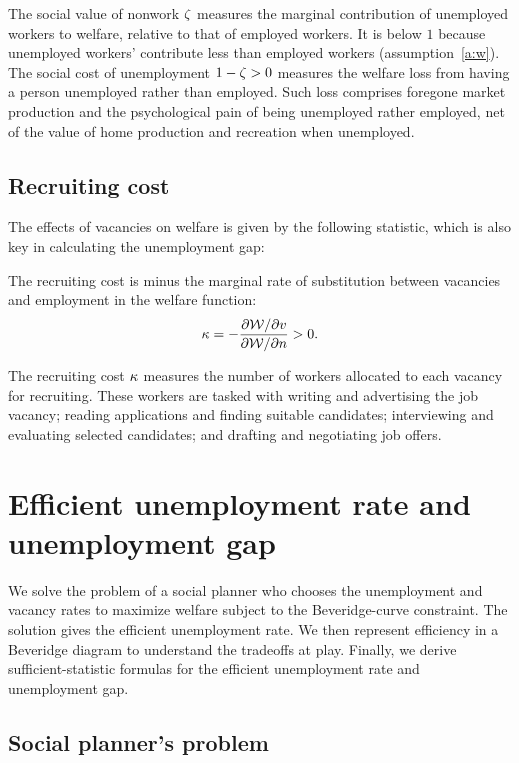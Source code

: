 \documentclass[letterpaper,12pt,leqno]{article}
\begin{document}
The social value of nonwork $\zeta$ measures the marginal contribution of unemployed workers to welfare, relative to that of employed workers. It is below $1$ because unemployed workers' contribute less than employed workers (assumption~\ref{a:w}). The social cost of unemployment $1-\zeta>0$ measures the welfare loss from having a person unemployed rather than employed. Such loss comprises foregone market production and the psychological pain of being unemployed rather employed, net of the value of home production and recreation when unemployed.

\subsection{Recruiting cost} 

The effects of vacancies on welfare is given by the following statistic, which is also key in calculating the unemployment gap:

\begin{definition} The recruiting cost is minus the marginal rate of substitution between vacancies and employment in the welfare function:
\begin{equation*}
\kappa = -\frac{\partial \mathcal{W}/\partial v}{\partial \mathcal{W}/\partial n} > 0.
\end{equation*}\end{definition}

The recruiting cost $\kappa$ measures the number of workers allocated to each vacancy for recruiting. These workers are tasked with writing and advertising the job vacancy; reading applications and finding suitable candidates; interviewing and evaluating selected candidates; and drafting and negotiating job offers.

\section{Efficient unemployment rate and unemployment gap}

We solve the problem of a social planner who chooses the unemployment and vacancy rates to maximize welfare subject to the Beveridge-curve constraint. The solution gives the efficient unemployment rate. We then represent efficiency in a Beveridge diagram to understand the tradeoffs at play. Finally, we derive sufficient-statistic formulas for the efficient unemployment rate and unemployment gap.

\subsection{Social planner's problem}
\end{document}
